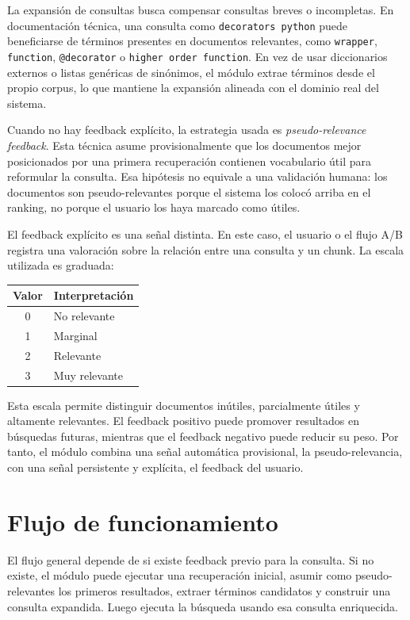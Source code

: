 \documentclass[12pt,a4paper]{article}
\begin{document}
La expansión de consultas busca compensar consultas breves o incompletas. En documentación técnica, una consulta como \texttt{decorators python} puede beneficiarse de términos presentes en documentos relevantes, como \texttt{wrapper}, \texttt{function}, \texttt{@decorator} o \texttt{higher order function}. En vez de usar diccionarios externos o listas genéricas de sinónimos, el módulo extrae términos desde el propio corpus, lo que mantiene la expansión alineada con el dominio real del sistema.

Cuando no hay feedback explícito, la estrategia usada es \textit{pseudo-relevance feedback}. Esta técnica asume provisionalmente que los documentos mejor posicionados por una primera recuperación contienen vocabulario útil para reformular la consulta. Esa hipótesis no equivale a una validación humana: los documentos son pseudo-relevantes porque el sistema los colocó arriba en el ranking, no porque el usuario los haya marcado como útiles.

El feedback explícito es una señal distinta. En este caso, el usuario o el flujo A/B registra una valoración sobre la relación entre una consulta y un chunk. La escala utilizada es graduada:

\begin{center}
\begin{tabular}{cl}
\toprule
\textbf{Valor} & \textbf{Interpretación} \\
\midrule
0 & No relevante \\
1 & Marginal \\
2 & Relevante \\
3 & Muy relevante \\
\bottomrule
\end{tabular}
\end{center}

Esta escala permite distinguir documentos inútiles, parcialmente útiles y altamente relevantes. El feedback positivo puede promover resultados en búsquedas futuras, mientras que el feedback negativo puede reducir su peso. Por tanto, el módulo combina una señal automática provisional, la pseudo-relevancia, con una señal persistente y explícita, el feedback del usuario.

\section{Flujo de funcionamiento}

El flujo general depende de si existe feedback previo para la consulta. Si no existe, el módulo puede ejecutar una recuperación inicial, asumir como pseudo-relevantes los primeros resultados, extraer términos candidatos y construir una consulta expandida. Luego ejecuta la búsqueda usando esa consulta enriquecida.
\end{document}
